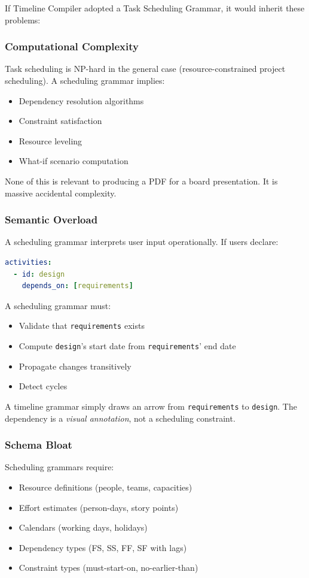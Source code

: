 If Timeline Compiler adopted a Task Scheduling Grammar, it would inherit these problems:

\subsubsection{Computational Complexity}

Task scheduling is NP-hard in the general case (resource-constrained project scheduling). A scheduling grammar implies:
\begin{itemize}
  \item Dependency resolution algorithms
  \item Constraint satisfaction
  \item Resource leveling
  \item What-if scenario computation
\end{itemize}

None of this is relevant to producing a PDF for a board presentation. It is massive accidental complexity.

\subsubsection{Semantic Overload}

A scheduling grammar interprets user input operationally. If users declare:
\begin{lstlisting}[language=yaml]
activities:
  - id: design
    depends_on: [requirements]
\end{lstlisting}

A scheduling grammar must:
\begin{itemize}
  \item Validate that \texttt{requirements} exists
  \item Compute \texttt{design}'s start date from \texttt{requirements}' end date
  \item Propagate changes transitively
  \item Detect cycles
\end{itemize}

A timeline grammar simply draws an arrow from \texttt{requirements} to \texttt{design}. The dependency is a \emph{visual annotation}, not a scheduling constraint.

\subsubsection{Schema Bloat}

Scheduling grammars require:
\begin{itemize}
  \item Resource definitions (people, teams, capacities)
  \item Effort estimates (person-days, story points)
  \item Calendars (working days, holidays)
  \item Dependency types (FS, SS, FF, SF with lags)
  \item Constraint types (must-start-on, no-earlier-than)
\end{itemize}

